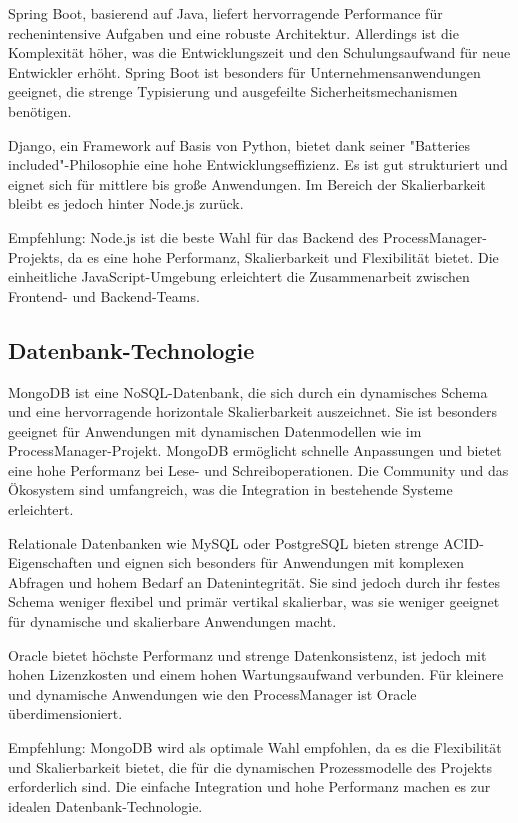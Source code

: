 Spring Boot, basierend auf Java, liefert hervorragende Performance für rechenintensive Aufgaben und eine robuste Architektur. Allerdings ist die Komplexität höher, was die Entwicklungszeit und den Schulungsaufwand für neue Entwickler erhöht. Spring Boot ist besonders für Unternehmensanwendungen geeignet, die strenge Typisierung und ausgefeilte Sicherheitsmechanismen benötigen. \cite[Vgl.][]{SpringBoot} \cite[Vgl.][]{Microsoft}

Django, ein Framework auf Basis von Python, bietet dank seiner "Batteries included"-Philosophie eine hohe Entwicklungseffizienz. Es ist gut strukturiert und eignet sich für mittlere bis große Anwendungen. Im Bereich der Skalierbarkeit bleibt es jedoch hinter Node.js zurück. \cite[Vgl.][]{Django}

Empfehlung: Node.js ist die beste Wahl für das Backend des ProcessManager-Projekts, da es eine hohe Performanz, Skalierbarkeit und Flexibilität bietet. Die einheitliche JavaScript-Umgebung erleichtert die Zusammenarbeit zwischen Frontend- und Backend-Teams.

\subsection{Datenbank-Technologie}
MongoDB ist eine NoSQL-Datenbank, die sich durch ein dynamisches Schema und eine hervorragende horizontale Skalierbarkeit auszeichnet. Sie ist besonders geeignet für Anwendungen mit dynamischen Datenmodellen wie im ProcessManager-Projekt. MongoDB ermöglicht schnelle Anpassungen und bietet eine hohe Performanz bei Lese- und Schreiboperationen. Die Community und das Ökosystem sind umfangreich, was die Integration in bestehende Systeme erleichtert. \cite[Vgl.][]{Holmes} \cite[Vgl.][]{Mongo} \cite[Vgl.][]{Trelle}

Relationale Datenbanken wie MySQL oder PostgreSQL bieten strenge ACID-Eigenschaften und eignen sich besonders für Anwendungen mit komplexen Abfragen und hohem Bedarf an Datenintegrität. Sie sind jedoch durch ihr festes Schema weniger flexibel und primär vertikal skalierbar, was sie weniger geeignet für dynamische und skalierbare Anwendungen macht. \cite[Vgl.][]{MySQL} \cite[Vgl.][]{MongoSQL}

Oracle bietet höchste Performanz und strenge Datenkonsistenz, ist jedoch mit hohen Lizenzkosten und einem hohen Wartungsaufwand verbunden. Für kleinere und dynamische Anwendungen wie den ProcessManager ist Oracle überdimensioniert.

Empfehlung: MongoDB wird als optimale Wahl empfohlen, da es die Flexibilität und Skalierbarkeit bietet, die für die dynamischen Prozessmodelle des Projekts erforderlich sind. Die einfache Integration und hohe Performanz machen es zur idealen Datenbank-Technologie. \cite[Vgl.][]{MongoSQL}

